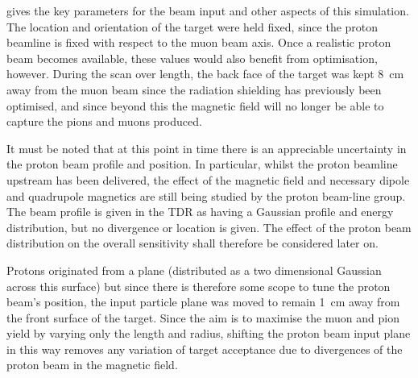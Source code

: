  gives the key parameters for the
beam input and other aspects of this simulation.  The location and orientation
of the target were held fixed, since the proton beamline is fixed with respect
to the muon beam axis.  Once a realistic proton beam becomes available, these
values would also benefit from optimisation, however.  During the scan over
length, the back face of the target was kept 8~cm away from the muon beam since
the radiation shielding has previously been optimised, and since beyond this
the magnetic field will no longer be able to capture the pions and muons
produced.

It must be noted that at this point in time there is an appreciable
uncertainty in the proton beam profile and position.  In particular, whilst the
proton beamline upstream has been delivered, the effect of the magnetic
field and necessary dipole and quadrupole magnetics are still being studied by
the proton beam-line group.  The beam profile is given in the \phaseI \ac{TDR}
as having a Gaussian profile and energy distribution, but no divergence or
location is given.  The effect of the proton beam distribution on the overall
sensitivity shall therefore be considered later on.

Protons originated from a plane (distributed as a two dimensional Gaussian
across this surface) but since there is therefore some scope to tune the proton
beam's position, the input particle plane was moved to remain 1~cm away from
the front surface of the target.  Since the aim is to maximise the muon and
pion yield by varying only the length and radius, shifting the proton beam
input plane in this way removes any variation of target acceptance due to
divergences of the proton beam in the magnetic field.

